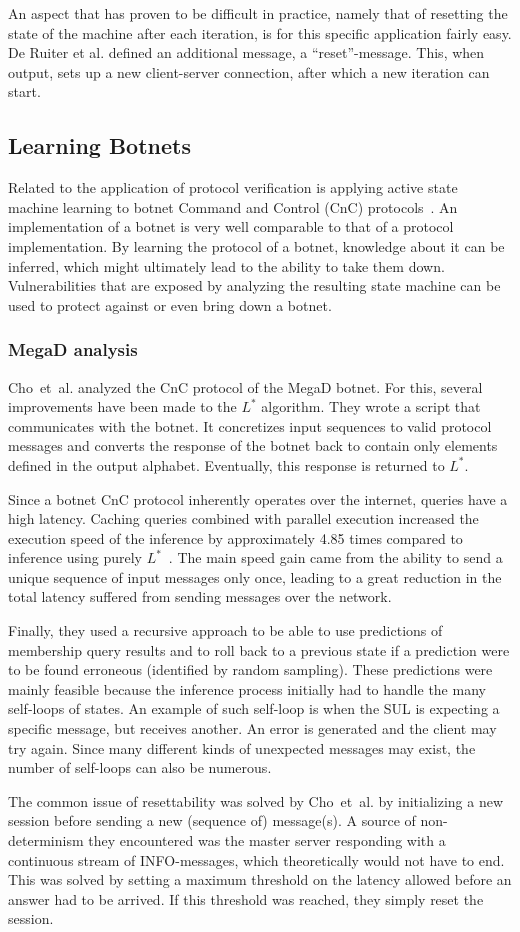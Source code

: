 \documentclass[multi,crop=false,class=article]{standalone}
\begin{document}
An aspect that has proven to be difficult in practice, namely
that of resetting the state of the machine after each iteration, is for this
specific application fairly easy. De Ruiter et al. defined an additional
message, a ``reset''-message. This, when output, sets up a new client-server
connection, after which a new iteration can start.

\subsection{Learning Botnets}
Related to the application of protocol verification is applying active state
machine learning to botnet Command and Control (CnC) protocols~\cite{Cho2010}.
An implementation of a botnet is very well comparable to that of a protocol
implementation. By learning the protocol of a botnet, knowledge about it
can be inferred, which might ultimately lead to the ability to take them down.
Vulnerabilities that are exposed by analyzing the resulting state
machine can be used to protect against or even bring down a botnet.

\subsubsection{MegaD analysis}
Cho~et~al. analyzed the CnC protocol of the MegaD botnet.
For this, several improvements have been made to the $L^*$ algorithm.
They wrote a script that communicates with the botnet. It concretizes input
sequences to valid protocol messages and converts the response of the botnet
back to contain only elements defined in the output alphabet. Eventually, this
response is returned to $L^*$.

Since a botnet CnC protocol inherently operates over the internet, queries have
a high latency. Caching queries combined with parallel execution increased the execution speed
of the inference by approximately 4.85 times compared to inference using purely
$L^*$~\cite{Cho2010}. The main speed gain came from the ability to send
a unique sequence of input messages only once, leading to a great reduction in
the total latency suffered from sending messages over the network.

Finally, they used a recursive approach to be able to use predictions of
membership query results and to roll back to a previous state if a prediction
were to be found erroneous (identified by random sampling). These predictions
were mainly feasible because the inference process initially had to handle the
many self-loops of states. An example of such self-loop is when the SUL is
expecting a specific message, but receives another. An error is generated and
the client may try again. Since many different kinds of unexpected messages may
exist, the number of self-loops can also be numerous.

The common issue of resettability was solved by Cho~et~al. by initializing a
new session before sending a new (sequence of) message(s). A source of
non-determinism they encountered was the master server responding with a
continuous stream of INFO-messages, which theoretically would not have to end.
This was solved by setting a maximum threshold on the latency allowed before an
answer had to be arrived. If this threshold was reached, they simply reset the
session.
\end{document}
